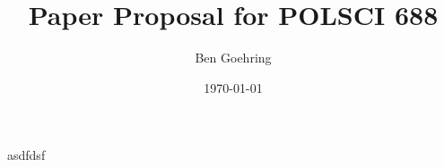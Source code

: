 \documentclass{article}
\title{Paper Proposal for POLSCI 688}
\author{Ben Goehring}
\date{\today}
\begin{document}
\begin{titlepage}
\maketitle
\end{titlepage}

asdfdsf \cite{hertel-fernandezBusinessAssociationsConservative2016}
 
\printbibliography
 
\end{document}
